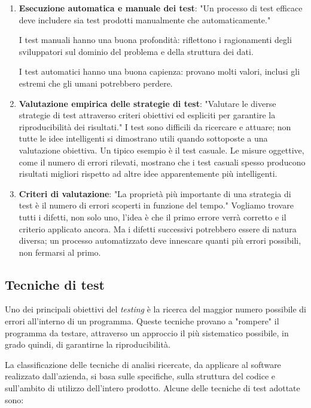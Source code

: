 \begin{enumerate}
\item \textbf{Esecuzione automatica e manuale dei test}:  "Un processo di test efficace deve includere sia test prodotti manualmente che automaticamente." 

I test manuali hanno una buona profondità: riflettono i ragionamenti degli sviluppatori sul dominio del problema e della struttura dei dati. 

I test automatici hanno una buona capienza: provano molti valori, inclusi gli estremi che gli umani potrebbero perdere.

\item \textbf{Valutazione empirica delle strategie di test}: "Valutare le diverse strategie di test attraverso criteri obiettivi ed espliciti per garantire la riproducibilità dei risultati." I test sono difficili da ricercare e attuare; non tutte le idee intelligenti si dimostrano utili quando sottoposte a una valutazione obiettiva. Un tipico esempio è il test casuale. Le misure oggettive, come il numero di errori rilevati, mostrano che i test casuali spesso producono risultati migliori rispetto ad altre idee apparentemente più intelligenti.

\item \textbf{Criteri di valutazione}: "La proprietà più importante di una strategia di test è il numero di errori scoperti in funzione del tempo." Vogliamo trovare tutti i difetti, non solo uno, l'idea è che il primo errore verrà corretto e il criterio applicato ancora. Ma i difetti successivi potrebbero essere di natura diversa; un processo automatizzato deve innescare quanti più errori possibili, non fermarsi al primo. 

\end{enumerate}

\subsection{Tecniche di test}
Uno dei principali obiettivi del \textit{ testing} è la ricerca del maggior numero possibile di errori all'interno di un programma. Queste tecniche provano a "rompere" il programma da testare, attraverso un approccio il più sistematico possibile, in grado quindi, di garantirne la riproducibilità. 

La classificazione delle tecniche di analisi ricercate, da applicare al software realizzato dall'azienda,  si basa sulle specifiche, sulla struttura del codice e sull'ambito di utilizzo dell'intero prodotto. Alcune delle tecniche di test adottate sono:


